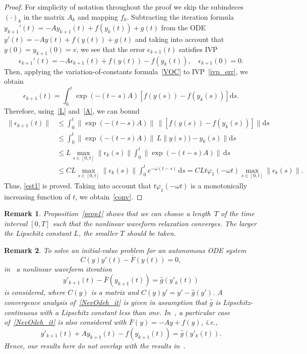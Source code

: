 \documentclass[sn-aps]{sn-jnl}
\theoremstyle{thmstyleone}%
\theoremstyle{thmstyletwo}%
\newtheorem{remark}{Remark}%
\theoremstyle{thmstylethree}%
\newcommand{\dd}{\mathrm{d}}
\newcommand{\leqs}{\leqslant}
\begin{document}
\begin{proof}
For simplicity of notation throughout the proof we skip the subindeces $(\cdot)_k$
in the matrix $A_k$ and mapping $f_k$.
Subtracting the iteration formula $y_{k+1}'(t) = -Ay_{k+1}(t) + f(y_k(t)) + g(t)$
from the ODE $y'(t)=-A y(t)  + f(y(t)) + g(t)$ and taking into
account that $y(0)=y_{k+1}(0)=v$, we see that the error 
$\epsilon_{k+1}(t)$ satisfies IVP
\begin{equation}
\label{ivp_err}
\epsilon_{k+1}'(t) = -A \epsilon_{k+1}(t) + f(y(t)) - f(y_k(t)),
\quad
\epsilon_{k+1}(0) = 0.
\end{equation}
Then, applying the variation-of-constants formula~\eqref{VOC}
to IVP~\eqref{ivp_err}, we obtain
$$
\epsilon_{k+1}(t) = \int_0^t \exp(-(t-s)A)\left[f(y(s))-f(y_k(s))\right]\dd s.
$$
Therefore, using~\eqref{L} and~\eqref{A}, we can bound
$$
\begin{aligned}
\|\epsilon_{k+1}(t)\| 
&\leqs 
\int_0^t \| \exp(-(t-s)A)\|\,\|\left[f(y(s))-f(y_k(s))\right]\|\dd s
\\
&\leqs 
\int_0^t \| \exp(-(t-s)A)\|\,L \|y(s))-y_k(s)\|\dd s
\\
&\leqs 
L\max_{s\in[0,t]}\|\epsilon_k(s)\| \int_0^t \| \exp(-(t-s)A)\|\,\dd s
\\
&\leqs C L\max_{s\in[0,t]}\|\epsilon_k(s)\| \int_0^t e^{-\omega(t-s)}\,\dd s
= C L t \varphi_1(-\omega t) \max_{s\in[0,t]}\|\epsilon_k(s)\|.
\end{aligned}
$$
Thus, \eqref{est1} is proved.  Taking into account that $t \varphi_1(-\omega t)$
is a monotonically increasing function of $t$, we obtain~\eqref{conv}.
\end{proof}

\begin{remark}
Proposition~\ref{prop1} shows that we can choose a length~$T$ of the time interval $[0,T]$
such that the nonlinear waveform relaxation converges.
The larger the Lipschitz constant $L$, the smaller $T$ should be taken.
\end{remark}

\begin{remark}
\label{NevOdeh}  
To solve an initial-value problem for an autonomous ODE system
$$
C(y)y'(t) -\bar{F}(y(t)) = 0,
$$
in~\cite{NevanlinnaOdeh1987} a nonlinear waveform iteration 
\begin{equation}
\label{NevOdeh_it}
y'_{k+1}(t) - \bar{F}(y_{k+1}(t)) = \widehat{g}(y'_k(t))
\end{equation}
is considered, where $C(y)$ is a matrix and $C(y)y' = y' - \widehat{g}(y')$.
A convergence analysis of~\eqref{NevOdeh_it} is given in assumption that 
$\widehat{g}$ is Lipschitz-continuous with a Lipschitz constant less than one.
In~\cite{NevanlinnaOdeh1987}, a particular case of~\eqref{NevOdeh_it}
is also considered with $\bar{F}(y) = -Ay + f(y)$, i.e.,
$$
y'_{k+1}(t) + Ay_{k+1}(t) - f(y_{k+1}(t)) = \widehat{g}(y'_k(t)).
$$
Hence, our results here do not overlap with the results in~\cite{NevanlinnaOdeh1987}. 
\end{remark}
\end{document}
